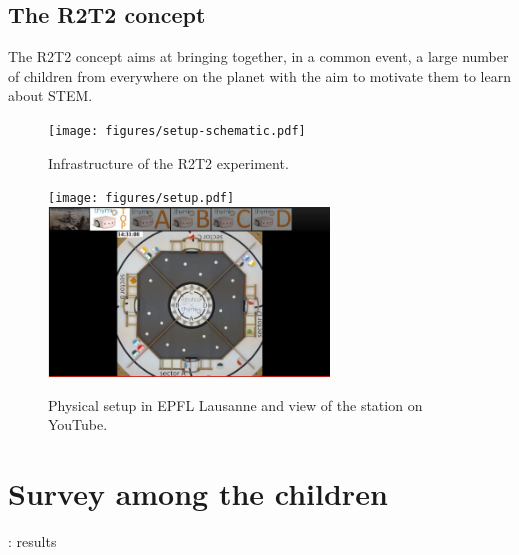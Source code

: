 \documentclass{intech-journal}
\begin{document}
\subsection{The R2T2 concept}

The R2T2 concept aims at bringing together, in a common event, a large number of children from everywhere on the planet with the aim to motivate them to learn about STEM.

\begin{figure}[ht]
 \centering
    \texttt{[image: figures/setup-schematic.pdf]}
  \caption{Infrastructure of the R2T2 experiment.}
  \label{fig:setup-scheme} 
\end{figure}

\begin{figure}[ht]
 \centering
    \texttt{[image: figures/setup.pdf]}
    \includegraphics[height=45mm]{figures/youtube-view.png}
  \caption{Physical setup in EPFL Lausanne and view of the station on YouTube.}
  \label{fig:setup-physical} 
\end{figure}


\section{Survey among the children}: results
\end{document}
